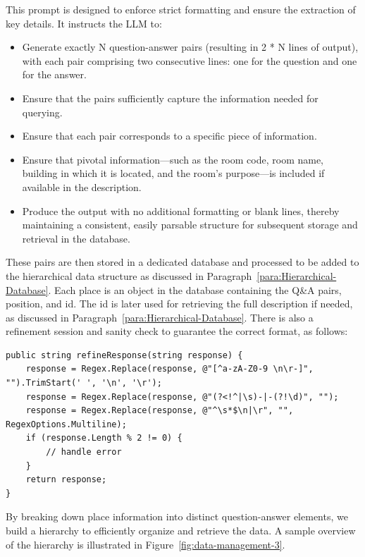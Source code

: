 This prompt is designed to enforce strict formatting and ensure the extraction of key details. It instructs the LLM to:
\begin{itemize}
    \item Generate exactly N question-answer pairs (resulting in 2 * N lines of output), with each pair comprising two consecutive lines: one for the question and one for the answer.
    \item Ensure that the pairs sufficiently capture the information needed for querying.
    \item Ensure that each pair corresponds to a specific piece of information.
    \item Ensure that pivotal information—such as the room code, room name, building in which it is located, and the room’s purpose—is included if available in the description.
    \item Produce the output with no additional formatting or blank lines, thereby maintaining a consistent, easily parsable structure for subsequent storage and retrieval in the database.
\end{itemize}

These pairs are then stored in a dedicated database and processed to be added to the hierarchical data structure as discussed in Paragraph~\ref{para:Hierarchical-Database}. Each place is an object in the database containing the Q\&A pairs, position, and id. The id is later used for retrieving the full description if needed, as discussed in Paragraph~\ref{para:Hierarchical-Database}. There is also a refinement session and sanity check to guarantee the correct format, as follows: \label{refine-session}

\begin{lstlisting}[style=cSharp]
public string refineResponse(string response) {
    response = Regex.Replace(response, @"[^a-zA-Z0-9 \n\r-]", "").TrimStart(' ', '\n', '\r');
    response = Regex.Replace(response, @"(?<!^|\s)-|-(?!\d)", "");
    response = Regex.Replace(response, @"^\s*$\n|\r", "", RegexOptions.Multiline);
    if (response.Length % 2 != 0) {
        // handle error
    }
    return response;
}
\end{lstlisting}    

\label{para:Hierarchical-Database}

By breaking down place information into distinct question-answer elements, we build a hierarchy to efficiently organize and retrieve the data. A sample overview of the hierarchy is illustrated in Figure~\ref{fig:data-management-3}.

